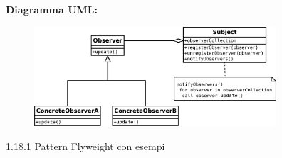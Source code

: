 \begin{solution}
\newline
\textbf{Diagramma UML:}
\begin{figure}[htb!]
	\centering
	\label{ObserverPattern}
	\includegraphics[width=9cm]{./immagini/observerPattern.png}
\end{figure}
\end{solution}

\begin{problem}{1.18.1}
Pattern Flyweight con esempi
\end{problem}
